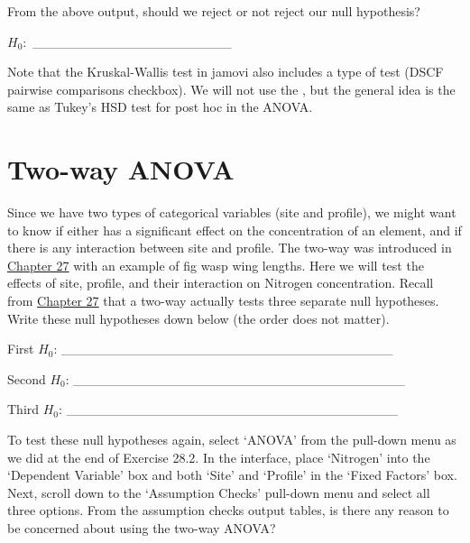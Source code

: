 \documentclass[
  openany]{krantz}
\begin{document}
From the above output, should we reject or not reject our null hypothesis?

\(H_{0}:\) \_\_\_\_\_\_\_\_\_\_\_\_\_\_\_\_\_\_\_\_\_

Note that the Kruskal-Wallis test in jamovi also includes a type of  test (DSCF pairwise comparisons checkbox).
We will not use the , but the general idea is the same as Tukey's HSD test for post hoc  in the ANOVA.

\hypertarget{two-way-anova}{%
\section{Two-way ANOVA}\label{two-way-anova}}

Since we have two types of categorical variables (site and profile), we might want to know if either has a significant effect on the concentration of an element, and if there is any interaction between site and profile.
The two-way  was introduced in \protect\hyperlink{Chapter_27}{Chapter 27} with an example of fig wasp wing lengths.
Here we will test the effects of site, profile, and their interaction on Nitrogen concentration.
Recall from \protect\hyperlink{Chapter_27}{Chapter 27} that a two-way  actually tests three separate null hypotheses.
Write these null hypotheses down below (the order does not matter).

First \(H_{0}\): \_\_\_\_\_\_\_\_\_\_\_\_\_\_\_\_\_\_\_\_\_\_\_\_\_\_\_\_\_\_\_\_\_\_\_

Second \(H_{0}\): \_\_\_\_\_\_\_\_\_\_\_\_\_\_\_\_\_\_\_\_\_\_\_\_\_\_\_\_\_\_\_\_\_\_\_

Third \(H_{0}\): \_\_\_\_\_\_\_\_\_\_\_\_\_\_\_\_\_\_\_\_\_\_\_\_\_\_\_\_\_\_\_\_\_\_\_

To test these null hypotheses again, select `ANOVA' from the pull-down menu as we did at the end of Exercise 28.2.
In the  interface, place `Nitrogen' into the `Dependent Variable' box and both `Site' and `Profile' in the `Fixed Factors' box.
Next, scroll down to the `Assumption Checks' pull-down menu and select all three options.
From the assumption checks output tables, is there any reason to be concerned about using the two-way ANOVA?

\begin{verbatim}
\end{verbatim}
\end{document}
